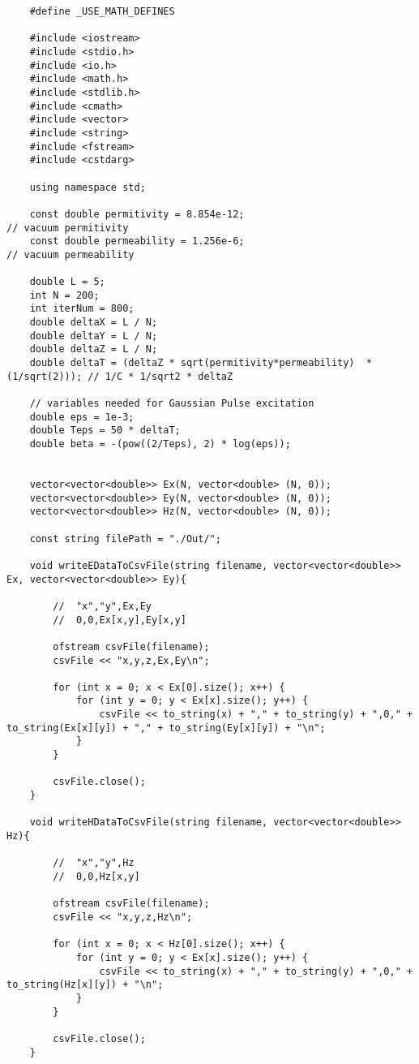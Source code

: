 \begin{verbatim}
	#define _USE_MATH_DEFINES
	
	#include <iostream>
	#include <stdio.h>
	#include <io.h>
	#include <math.h>
	#include <stdlib.h>
	#include <cmath>
	#include <vector>
	#include <string>
	#include <fstream>
	#include <cstdarg>
	
	using namespace std;
	
	const double permitivity = 8.854e-12;												// vacuum permitivity
	const double permeability = 1.256e-6; 								                // vacuum permeability
	
	double L = 5;
	int N = 200;
	int iterNum = 800;
	double deltaX = L / N;
	double deltaY = L / N;
	double deltaZ = L / N;
	double deltaT = (deltaZ * sqrt(permitivity*permeability)  * (1/sqrt(2))); // 1/C * 1/sqrt2 * deltaZ
	
	// variables needed for Gaussian Pulse excitation
	double eps = 1e-3;
	double Teps = 50 * deltaT;
	double beta = -(pow((2/Teps), 2) * log(eps));
	
	
	vector<vector<double>> Ex(N, vector<double> (N, 0));
	vector<vector<double>> Ey(N, vector<double> (N, 0));
	vector<vector<double>> Hz(N, vector<double> (N, 0));
	
	const string filePath = "./Out/";
	
	void writeEDataToCsvFile(string filename, vector<vector<double>> Ex, vector<vector<double>> Ey){
		
		//	"x","y",Ex,Ey
		//	0,0,Ex[x,y],Ey[x,y]
		
		ofstream csvFile(filename);
		csvFile << "x,y,z,Ex,Ey\n";
		
		for (int x = 0; x < Ex[0].size(); x++) {
			for (int y = 0; y < Ex[x].size(); y++) {
				csvFile << to_string(x) + "," + to_string(y) + ",0," + to_string(Ex[x][y]) + "," + to_string(Ey[x][y]) + "\n";
			}
		}
		
		csvFile.close();
	}
	
	void writeHDataToCsvFile(string filename, vector<vector<double>> Hz){
		
		//	"x","y",Hz
		//	0,0,Hz[x,y]
		
		ofstream csvFile(filename);
		csvFile << "x,y,z,Hz\n";
		
		for (int x = 0; x < Hz[0].size(); x++) {
			for (int y = 0; y < Ex[x].size(); y++) {
				csvFile << to_string(x) + "," + to_string(y) + ",0," + to_string(Hz[x][y]) + "\n";
			}
		}
		
		csvFile.close();
	}
	

\end{verbatim}
